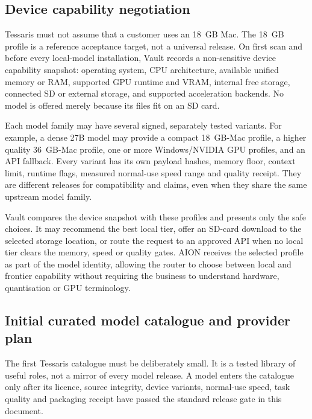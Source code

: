 \subsection{Device capability negotiation}

Tessaris must not assume that a customer uses an 18~GB Mac.  The 18~GB profile
is a reference acceptance target, not a universal release.  On first scan and
before every local-model installation, Vault records a non-sensitive device
capability snapshot: operating system, CPU architecture, available unified
memory or RAM, supported GPU runtime and VRAM, internal free storage, connected
SD or external storage, and supported acceleration backends.  No model is
offered merely because its files fit on an SD card.

Each model family may have several signed, separately tested variants.  For
example, a dense 27B model may provide a compact 18~GB-Mac profile, a higher
quality 36~GB-Mac profile, one or more Windows/NVIDIA GPU profiles, and an
API fallback.  Every variant has its own payload hashes, memory floor, context
limit, runtime flags, measured normal-use speed range and quality receipt.
They are different releases for compatibility and claims, even when they share
the same upstream model family.

Vault compares the device snapshot with these profiles and presents only the
safe choices.  It may recommend the best local tier, offer an SD-card download
to the selected storage location, or route the request to an approved API when
no local tier clears the memory, speed or quality gates.  AION receives the
selected profile as part of the model identity, allowing the router to choose
between local and frontier capability without requiring the business to
understand hardware, quantisation or GPU terminology.

\subsection{Initial curated model catalogue and provider plan}

The first Tessaris catalogue must be deliberately small.  It is a tested
library of useful roles, not a mirror of every model release.  A model enters
the catalogue only after its licence, source integrity, device variants,
normal-use speed, task quality and packaging receipt have passed the standard
release gate in this document.

